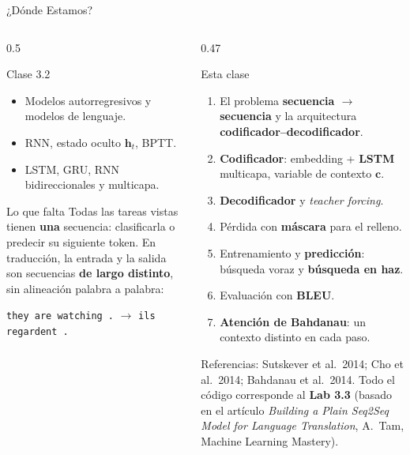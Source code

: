 \documentclass[aspectratio=169, 10pt]{beamer}
\begin{document}
\begin{frame}[shrink]{¿D\'onde Estamos?}

	\begin{columns}[T]
		\begin{column}{0.5\textwidth}
			\begin{block}{Clase 3.2}
				\small
				\begin{itemize}
					\item Modelos autorregresivos y modelos de lenguaje.
					\item RNN, estado oculto $\mathbf{h}_t$, BPTT.
					\item LSTM, GRU, RNN bidireccionales y multicapa.
				\end{itemize}
			\end{block}

			\begin{alertblock}{Lo que falta}
				\small
				Todas las tareas vistas tienen \textbf{una} secuencia: clasificarla o predecir su siguiente token. En traducci\'on, la entrada y la salida son secuencias \textbf{de largo distinto}, sin alineaci\'on palabra a palabra:
				\begin{center}
					\texttt{they are watching .} $\to$ \texttt{ils regardent .}
				\end{center}
			\end{alertblock}
		\end{column}

		\begin{column}{0.47\textwidth}
			\begin{block}{Esta clase}
				\small
				\begin{enumerate}
					\item El problema \textbf{secuencia $\to$ secuencia} y la arquitectura \textbf{codificador--decodificador}.
					\item \textbf{Codificador}: embedding + \textbf{LSTM} multicapa, variable de contexto $\mathbf{c}$.
					\item \textbf{Decodificador} y \emph{teacher forcing}.
					\item P\'erdida con \textbf{m\'ascara} para el relleno.
					\item Entrenamiento y \textbf{predicci\'on}: b\'usqueda voraz y \textbf{b\'usqueda en haz}.
					\item Evaluaci\'on con \textbf{BLEU}.
					\item \textbf{Atenci\'on de Bahdanau}: un contexto distinto en cada paso.
				\end{enumerate}
			\end{block}
			\small
			Referencias: Sutskever et al.\ 2014; Cho et al.\ 2014; Bahdanau et al.\ 2014. Todo el c\'odigo corresponde al \textbf{Lab 3.3} (basado en el art\'iculo \textit{Building a Plain Seq2Seq Model for Language Translation}, A.\ Tam, Machine Learning Mastery).
		\end{column}
	\end{columns}

\end{frame}
\end{document}
